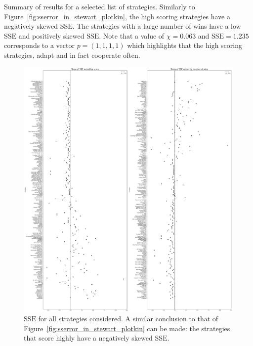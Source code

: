 \documentclass[a4paper]{article}
\newcommand{\SSe}{\text{SSE}}
\begin{document}
\begin{table}[!hbtp]
    \begin{center}
    \tiny
    
    \end{center}
    \caption{Summary of results for a selected list of strategies. Similarly to
        Figure~\ref{fig:sserror_in_stewart_plotkin}, the high scoring strategies
        have a negatively skewed \(\SSe\). The strategies with a
        large number of wins have a low \(\SSe\) and positively skewed
        \(\SSe\). Note that a value of \(\chi=0.063\) and \(\SSe=1.235\)
        corresponds to a vector \(p=(1,1,1,1)\) which highlights that the high
        scoring strategies, adapt and in fact cooperate often.}
    \label{tbl:overall_summary_results}
\end{table}

\begin{figure}[!htbp]
    \centering
    \includegraphics[width=\textwidth]{./assets/img/sserror_in_std/main.pdf}
    \caption{\(\SSe\) for all strategies considered.
        A similar conclusion to that of
        Figure~\ref{fig:sserror_in_stewart_plotkin} can be made: the strategies
        that score highly have a negatively skewed \(\SSe\).}
        \label{fig:sserror_in_std}
\end{figure}
\end{document}
